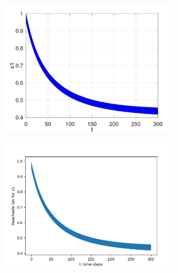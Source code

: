 \documentclass[EPiC]{easychair}
\begin{document}
\begin{figure}[h]
    \begin{subfigure}{0.47\textwidth}
    \centering
    \includegraphics[width=\textwidth]{SapoFigures/LV/SapoLV_X1.jpg}
    \end{subfigure}
    \begin{subfigure}{0.47\textwidth}
    \centering
    \includegraphics[width=1.1\textwidth,height=0.85\textwidth]{SapoFigures/LV/KaaLV_X1.png}
    \end{subfigure}
    

\end{figure}
\end{document}
